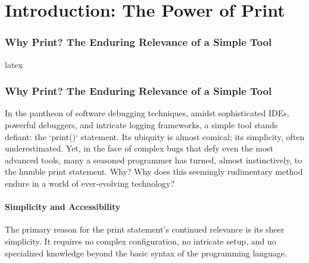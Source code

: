 \documentclass{article}
\begin{document}

\part*{Introduction: The Power of Print} %
\label{part-2-Introduction__The_Power_of_Print}


\section*{Why Print? The Enduring Relevance of a Simple Tool} %
\label{chapter-2-1-Why_Print__The_Enduring_Relevance_of_a_S}

latex
\section*{Why Print? The Enduring Relevance of a Simple Tool}

In the pantheon of software debugging techniques, amidst sophisticated IDEs, powerful debuggers, and intricate logging frameworks, a simple tool stands defiant: the `print()` statement.  Its ubiquity is almost comical; its simplicity, often underestimated.  Yet, in the face of complex bugs that defy even the most advanced tools, many a seasoned programmer has turned, almost instinctively, to the humble print statement.  Why?  Why does this seemingly rudimentary method endure in a world of ever-evolving technology?

\subsection*{Simplicity and Accessibility}

The primary reason for the print statement's continued relevance is its sheer simplicity.  It requires no complex configuration, no intricate setup, and no specialized knowledge beyond the basic syntax of the programming language.
\end{document}
